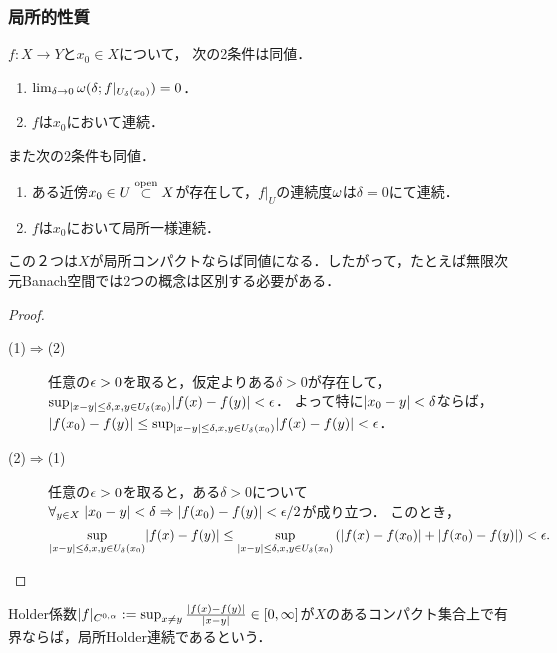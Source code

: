 \documentclass[uplatex,dvipdfmx]{jsreport}
\begin{document}
\subsubsection{局所的性質}

\begin{lemma}
    $f:X\to Y$と$x_0\in X$について，
    次の2条件は同値．
    \begin{enumerate}
        \item $\lim_{\delta\to0}\omega(\delta;f|_{U_\delta(x_0)})=0$．
        \item $f$は$x_0$において連続．
    \end{enumerate}
    また次の2条件も同値．
    \begin{enumerate}
        \item ある近傍$x_0\in U\overset{\mathrm{open}}{\subset} X$が存在して，$f|_U$の連続度$\omega$は$\delta=0$にて連続．
        \item $f$は$x_0$において局所一様連続．
    \end{enumerate}
\end{lemma}
\begin{remark}
    この２つは$X$が局所コンパクトならば同値になる．したがって，たとえば無限次元Banach空間では2つの概念は区別する必要がある．
\end{remark}
\begin{proof}\mbox{}
    \begin{description}
        \item[(1)$\Rightarrow$(2)] 
        任意の$\epsilon>0$を取ると，仮定よりある$\delta>0$が存在して，$\sup_{\lvert x-y\rvert\le\delta,x,y\in U_{\delta}(x_0)}\lvert f(x)-f(y)\rvert<\epsilon$．
        よって特に$\lvert x_0-y\rvert<\delta$ならば，$\lvert f(x_0)-f(y)\rvert\le \sup_{\lvert x-y\rvert\le\delta,x,y\in U_{\delta}(x_0)}\lvert f(x)-f(y)\rvert<\epsilon$．
        \item[(2)$\Rightarrow$(1)]
        任意の$\epsilon>0$を取ると，ある$\delta>0$について$\forall_{y\in X}\;\lvert x_0-y\rvert<\delta\Rightarrow\lvert f(x_0)-f(y)\rvert<\epsilon/2$が成り立つ．
        このとき，
        \[\sup_{\lvert x-y\rvert\le\delta,x,y\in U_\delta(x_0)}\lvert f(x)-f(y)\rvert\le\sup_{\lvert x-y\rvert\le\delta,x,y\in U_\delta(x_0)}\left(\lvert f(x)-f(x_0)\rvert+\lvert f(x_0)-f(y)\rvert\right)<\epsilon.\]
    \end{description}
\end{proof}

\begin{definition}
    Holder係数$\lvert f\rvert_{C^{0,\alpha}}:=\sup_{x\ne y}\frac{\lvert f(x)-f(y)\rvert}{\lvert x-y\rvert}\in[0,\infty]$が$X$のあるコンパクト集合上で有界ならば，局所Holder連続であるという．
\end{definition}
\end{document}
